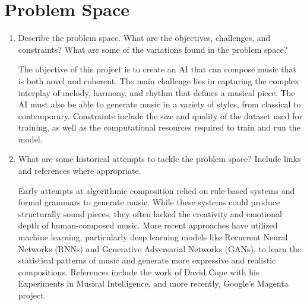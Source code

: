 \documentclass[]{article}
\begin{document}
\section{Problem Space}
\begin{enumerate}
	\item Describe the problem space. What are the objectives, challenges, and constraints? What are some of the variations found in the problem space?

    The objective of this project is to create an AI that can compose music that is both novel and coherent. The main challenge lies in capturing the complex interplay of melody, harmony, and rhythm that defines a musical piece. The AI must also be able to generate music in a variety of styles, from classical to contemporary. Constraints include the size and quality of the dataset used for training, as well as the computational resources required to train and run the model.

	\item What are some historical attempts to tackle the problem space? Include links and references where appropriate.

    Early attempts at algorithmic composition relied on rule-based systems and formal grammars to generate music. While these systems could produce structurally sound pieces, they often lacked the creativity and emotional depth of human-composed music. More recent approaches have utilized machine learning, particularly deep learning models like Recurrent Neural Networks (RNNs) and Generative Adversarial Networks (GANs), to learn the statistical patterns of music and generate more expressive and realistic compositions. References include the work of David Cope with his Experiments in Musical Intelligence, and more recently, Google's Magenta project.
\end{enumerate}
\end{document}
